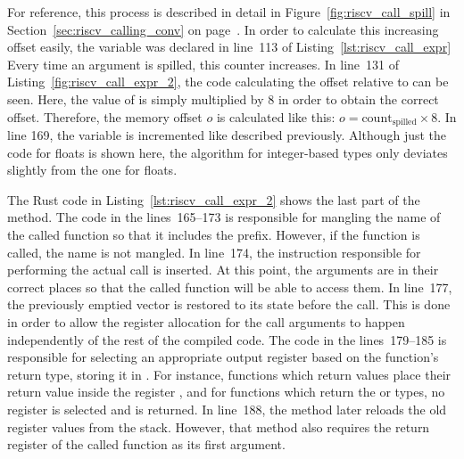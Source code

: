 For reference, this process is described in detail in Figure~\ref{fig:riscv_call_spill} in Section~\ref{sec:riscv_calling_conv} on page~\pageref{sec:riscv_calling_conv}.
In order to calculate this increasing offset easily, the  variable was declared in line~113 of Listing~\ref{lst:riscv_call_expr}
Every time an argument is spilled, this counter increases.
In line~131 of Listing~\ref{fig:riscv_call_expr_2}, the code calculating the offset relative to  can be seen.
Here, the value of  is simply multiplied by 8 in order to obtain the correct offset.
Therefore, the memory offset $o$ is calculated like this: $o = \text{count}_\text{spilled} \times 8$.
In line 169, the  variable is incremented like described previously.
Although just the code for floats is shown here, the algorithm for integer-based types only deviates slightly from the one for floats.

The Rust code in Listing~\ref{lst:riscv_call_expr_2} shows the last part of the method.%
%
%
The code in the lines~165--173 is responsible for mangling the name of the called function so that it includes the  prefix.
However, if the  function is called, the name is not mangled.
In line~174, the  instruction responsible for performing the actual call is inserted.
At this point, the arguments are in their correct places so that the called function will be able to access them.
In line~177, the previously emptied  vector is restored to its state before the call.
This is done in order to allow the register allocation for the call arguments to happen independently of the rest of the compiled code.
The code in the lines~179--185 is responsible for selecting an appropriate output register based on the function's return type, storing it in .
For instance, functions which return  values place their return value inside the register , and for functions which return the \qVerb{()} or \qVerb{!} types, no register is selected and  is returned.
In line~188, the method  later reloads the old register values from the stack.
However, that method also requires the return register of the called function as its first argument.



